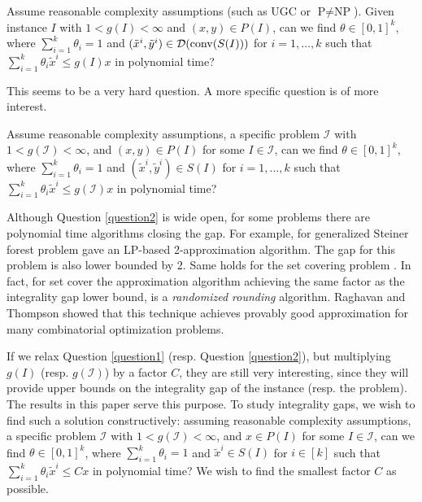 \begin{question*}\label{question1}
	Assume reasonable complexity assumptions (such as UGC or $\textrm{P}\neq \textrm{NP}$). Given instance $I$ with $1<g(I)<\infty$ and $(x,y)\in P(I)$, can we find $\theta \in [0,1]^k$, where $\sum_{i=1}^{k}\theta_i =1$ and $(\tilde{x}^i,\tilde{y}^i)\in \operatorname{\mathcal{D}}(\operatorname{conv}(S(I)))$ for $i=1,\ldots,k$ such that $\sum_{i=1}^{k}\theta_i \tilde{x}^i\leq g(I)x$ in polynomial time?
\end{question*}

This seems to be a very hard question. A more specific question is of more interest.

\begin{question}\label{question2}
	Assume reasonable complexity assumptions, a specific problem $\mathcal{I}$ with  $1<g({\mathcal{I}})<\infty$, and $(x,y)\in P(I)$ for some $I\in \mathcal{I}$, can we find $\theta \in [0,1]^k$, where $\sum_{i=1}^{k}\theta_i =1$ and $(\tilde{x}^i,\tilde{y}^i)\in S(I)$ for $i=1,\ldots,k$ such that $\sum_{i=1}^{k}\theta_i \tilde{x}^i\leq g(\mathcal{I})x$ in polynomial time?
\end{question}
Although Question \ref{question2} is wide open, for some problems there are polynomial time algorithms closing the gap. For example, for generalized Steiner forest problem \cite{jain} gave an LP-based 2-approximation algorithm. The gap for this problem is also lower bounded by 2. Same holds for the set covering problem \cite{randomizedrounding}. In fact, for set cover the approximation algorithm achieving the same factor as the integrality gap lower bound, is a \textit{randomized rounding} algorithm. Raghavan and Thompson \cite{randomizedrounding} showed that this technique achieves provably good approximation for many combinatorial optimization problems.  

If we relax Question \ref{question1} (resp. Question \ref{question2}), but multiplying $g(I)$ (resp. $g(\mathcal{I})$) by a factor $C$, they are still very interesting, since they will provide upper bounds on the integrality gap of the instance (resp. the problem). The results in this paper serve this purpose.
\fi
To study integrality gaps, we wish to find such a solution constructively: assuming reasonable complexity assumptions, a specific problem $\mathcal{I}$ with  $1<g(\mathcal{I})<\infty$, and $x\in P(I)$ for some $I\in \mathcal{I}$, can we find $\theta \in [0,1]^k$, where $\sum_{i=1}^{k}\theta_i =1$ and $\tilde{x}^i\in S(I)$ for $i\in [k]$ such that $\sum_{i=1}^{k}\theta_i \tilde{x}^i\leq Cx$ in polynomial time? We wish to find the smallest factor $C$ as possible.

